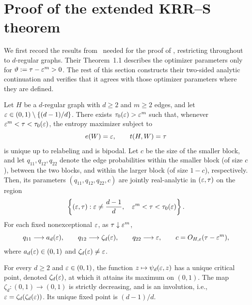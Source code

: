\section{Proof of the extended KRR--S theorem}\label{app:krrs-analytic-extension}

We first record the results from~\cite{kenyon2014entropy} needed for the
proof of , restricting throughout to
$d$-regular graphs.
Their Theorem~1.1 describes the optimizer parameters only for
\(\vartheta:=\tau-\varepsilon^m>0\).  The rest of this section constructs their
two-sided analytic continuation and verifies that it agrees with those
optimizer parameters where they are defined.

\begin{theorem}
\label{thm:krrs-bipodality}
Let \(H\) be a \(d\)-regular graph with \(d\ge2\) and \(m\ge2\) edges, and let
\(\varepsilon\in(0,1)\setminus\{(d-1)/d\}\).  There exists
\(\tau_0(\varepsilon)>\varepsilon^m\) such that, whenever
\(\varepsilon^m<\tau<\tau_0(\varepsilon)\), the entropy maximizer subject to
\[
  e(W)=\varepsilon,
  \qquad
  t(H,W)=\tau
\]
is unique up to relabeling and is bipodal.  Let $c$ be the size of the smaller block,
and let $q_{11},q_{12},q_{22}$ denote the edge probabilities within the smaller block (of size $c$),
between the two blocks, and within the larger block (of size $1-c$), respectively.
Then, its parameters \((q_{11},q_{12},q_{22},c)\) are jointly
real-analytic in \((\varepsilon,\tau)\) on the region
\[
  \left\{(\varepsilon,\tau):
    \varepsilon\ne\frac{d-1}{d},\quad
    \varepsilon^m<\tau<\tau_0(\varepsilon)\right\}.
\]
For each fixed nonexceptional \(\varepsilon\), as \(\tau\downarrow\varepsilon^m\),
\[
  q_{11}\longrightarrow a_d(\varepsilon),
  \qquad
  q_{12}\longrightarrow\zeta_d(\varepsilon),
  \qquad
  q_{22}\longrightarrow\varepsilon,
  \qquad
  c=O_{H,\varepsilon}(\tau-\varepsilon^m),
\]
where \(a_d(\varepsilon)\in(0,1)\) and \(\zeta_d(\varepsilon)\ne\varepsilon\).
\end{theorem}

\begin{theorem}
\label{thm:krrs-cross-density}
For every \(d\ge2\) and \(\varepsilon\in(0,1)\), the function
\(z\mapsto\psi_d(\varepsilon,z)\) has a unique critical point, denoted
\(\zeta_d(\varepsilon)\), at which it attains its maximum on \((0,1)\).
The map \(\zeta_d:(0,1)\to(0,1)\) is strictly decreasing, and is an involution, i.e.,
$\varepsilon=\zeta_d(\zeta_d(\varepsilon))$.  Its unique fixed point is \((d-1)/d\).
\end{theorem}

